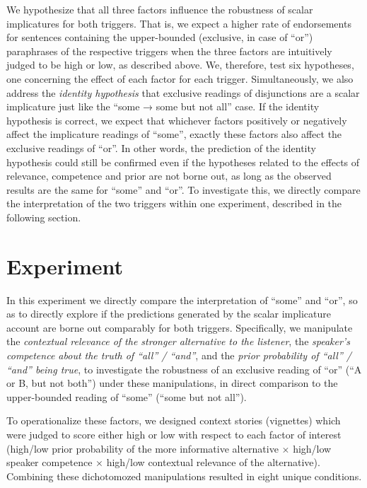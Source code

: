 \documentclass{sp}
\begin{document}
We hypothesize that all three factors influence the robustness of scalar implicatures for both triggers. That is, we expect a higher rate of endorsements for sentences containing the upper-bounded (exclusive, in case of ``or'') paraphrases of the respective triggers when the three factors are intuitively judged to be high or low, as described above. We, therefore, test six hypotheses, one concerning the effect of each factor for each trigger. 
Simultaneously,  we also address the \textit{identity hypothesis} that exclusive readings of disjunctions are a scalar implicature just like the ``some → some but not all'' case. If the identity hypothesis is correct, we expect that whichever factors positively or negatively affect the implicature readings of ``some'', exactly these factors also affect the exclusive readings of ``or''. In other words, the prediction of the identity hypothesis could still be confirmed even if the hypotheses related to the effects of relevance, competence and prior are not borne out, as long as the observed results are the same for ``some'' and ``or''. To investigate this, we directly compare the interpretation of the two triggers within one experiment, described in the following section.

\section{Experiment}

In this experiment we directly compare the interpretation of ``some'' and ``or'', so as to directly explore if the predictions generated by the scalar implicature account are borne out comparably for both triggers. Specifically, we manipulate the \textit{contextual relevance of the stronger alternative to the listener}, the \textit{speaker's competence about the truth of ``all'' / ``and''}, and the \textit{prior probability of ``all'' / ``and'' being true}, to investigate the robustness of an exclusive reading of ``or'' (``A or B, but not both'') under these manipulations, in direct comparison to the upper-bounded reading of “some” (``some but not all'').

To operationalize these factors, we designed context stories (vignettes) which were judged to score either high or low with respect to each factor of interest (high/low prior probability of the more informative alternative $\times$ high/low speaker competence $\times$ high/low contextual relevance of the alternative). Combining these dichotomozed manipulations resulted in eight unique conditions. 
\end{document}
